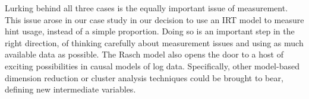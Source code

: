 \documentclass{article}
\begin{document}
Lurking behind all three cases is the equally important issue of
measurement.
This issue arose in our case study in our decision to use an IRT model
to measure hint usage, instead of a simple proportion.
Doing so is an important step in the right direction, of thinking
carefully about measurement issues and using as much available data as
possible.
The Rasch model also opens the door to a host of exciting
possibilities in causal models of log data.
Specifically, other model-based dimension reduction or cluster analysis techniques
could be brought to bear, defining new intermediate variables.






\end{document}
